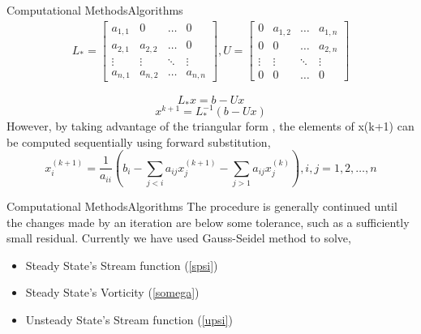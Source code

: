 \documentclass[11pt]{beamer}
\begin{document}
\begin{frame}{Computational Methods}{Algorithms}
\begin{eqnarray}
L_{*}=\begin{bmatrix}
a_{1,1} & 0 & \ldots & 0 \\ 
a_{2,1} & a_{2,2} & \ldots & 0\\ 
\vdots & \vdots & \ddots & \vdots \\ 
a_{n,1} & a_{n,2} & \ldots & a_{n,n}
\end{bmatrix} ,  
U=\begin{bmatrix}
0 & a_{1,2} & \ldots & a_{1,n} \\ 
0 & 0 & \ldots & a_{2,n}\\ 
\vdots & \vdots & \ddots & \vdots \\ 
0 & 0 & \ldots & 0
\end{bmatrix}
\end{eqnarray}

$$L_{*}x=b-Ux$$
$$x^{k+1}=L_{*}^{-1}(b-Ux)$$
However, by taking advantage of the triangular form , the elements of x(k+1) can be computed sequentially using forward substitution,
\begin{equation}
x_{i}^{(k+1)}=\frac{1}{a_{ii}}\left(b_{i}-\sum_{j<i}a_{ij}x_{j}^{(k+1)}-\sum_{j>1}a_{ij}x_{j}^{(k)}\right), i,j=1,2,\ldots,n
\end{equation}
\end{frame}

\begin{frame}{Computational Methods}{Algorithms}
The procedure is generally continued until the changes made by an iteration are below some tolerance, such as a sufficiently small residual.
\linebreak
\linebreak
Currently we have used Gauss-Seidel method to solve,
\begin{itemize}
\item Steady State's Stream function (\ref{spsi})
\item Steady State's Vorticity (\ref{somega})
\item  Unsteady State's Stream function (\ref{upsi})
\end{itemize}
\end{frame}
\end{document}
